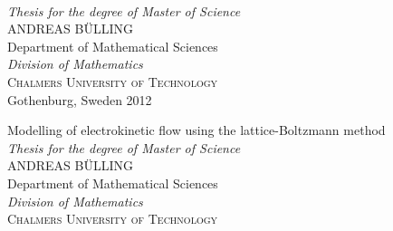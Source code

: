 \begin{titlepage}

\mbox{}
\vspace{50mm}

\mbox{}
\vfill
\addtolength{\voffset}{2cm}
\begin{flushleft}
	{ \\[0.3cm] \emph{\Large Thesis
            for the degree of Master of Science} \\[.8cm]
	
	{\LARGE ANDREAS B\"{U}LLING}\\[.8cm]
	
	{\Large Department of Mathematical Sciences \\
         \emph{Division of Mathematics} \\
	\textsc{Chalmers University of Technology} \\
	Gothenburg, Sweden 2012 \\
	} 
	}
\end{flushleft}

\end{titlepage}
\ClearShipoutPicture

\pagestyle{empty}
\newpage
\clearpage
\mbox{}




\restoregeometry

\newpage
\clearpage
\thispagestyle{empty}

\noindent Modelling of electrokinetic flow using the lattice-Boltzmann
method\\ 
\emph{Thesis for the degree of Master of Science}\\ 
ANDREAS B\"{U}LLING\\
Department of Mathematical Sciences \\
\emph{Division of Mathematics} \\
\textsc{Chalmers University of Technology} 

\vspace{20pt}

